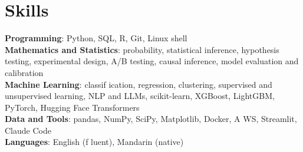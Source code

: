 \documentclass[letterpaper,11pt]{article}
\begin{document}
\section{\textbf{Skills}}
 \begin{itemize}[leftmargin=0.15in, label={}]
    \small{\item{
     \textbf{Programming}{: Python, SQL, R, Git, Linux shell} \\
     \textbf{Mathematics and Statistics}{: probability, statistical inference, hypothesis testing, experimental design, A/B testing, causal inference, model evaluation and calibration} \\
     \textbf{Machine Learning}{: classif\kern0pt ication, regression, clustering, supervised and unsupervised learning, NLP and LLMs, scikit-learn, XGBoost, LightGBM, PyTorch, Hugging Face Transformers} \\
     \textbf{Data and Tools}{: pandas, NumPy, SciPy, Matplotlib, Docker, A\kern0pt WS, Streamlit, Claude Code} \\
     \textbf{Languages}{: English (f\kern0pt luent), Mandarin (native)}}}

 \end{itemize}
\end{document}
